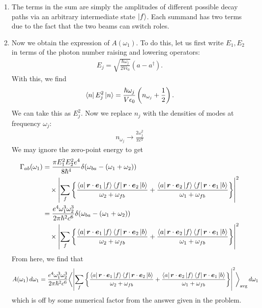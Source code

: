 \documentclass{article}
\theoremstyle{definition}
\newcommand{\f}[2]{\frac{#1}{#2}}
\newcommand{\lp}{\left(}
\newcommand{\rp}{\right)}
\newcommand{\lc}{\left\{}
\newcommand{\rc}{\right\}}
\begin{document}
\begin{enumerate}
\begin{enumerate}[label=(\roman*)]
		
		
		\item The terms in the sum are simply the amplitudes of different possible decay paths via an arbitrary intermediate state $\ket{f}$. Each summand has two terms due to the fact that the two beams can switch roles.
		
		\item Now we obtain the expression of $A(\omega_1)$. To do this, let us first write $E_1,E_2$ in terms of the photon number raising and lowering operators:
		\begin{align*}
		E_j = \sqrt{\f{\hbar \omega_j}{2 V \epsilon_0}}(a - a^\dagger).
		\end{align*}
		With this, we find 
		\begin{align*}
		\bra{n} E_j^2 \ket{n} = \f{\hbar \omega_j}{V\epsilon_0} \lp n_{\omega_j} + \f{1}{2} \rp.
		\end{align*}
		We can take this as $E_j^2$. Now we replace $n_j$ with the densities of modes at frequency $\omega_j$:
		\begin{align*}
		n_{\omega_j} \to \f{2\omega_j^2}{\pi c^3}
		\end{align*}
		We may ignore the zero-point energy to get
		\begin{align*}
		\Gamma_{ab}(\omega_1) &= \f{\pi E_1^2 E_2^2 e^4}{8\hbar^4}\delta(\omega_{ba} - (\omega_1 + \omega_2)) \\
		&\quad \times \abs{ \sum_f 
			\lc 
			\f{\bra{a} \bm{r}\cdot \bm{e}_1\ket{f}\bra{f} \bm{r}\cdot {\bm{e}}_2 \ket{b}}{\omega_2 + \omega_{fb}} + 
			\f{\bra{a} \bm{r}\cdot \bm{e}_2\ket{f}\bra{f} \bm{r}\cdot {\bm{e}}_1 \ket{b}}{\omega_{1} + \omega_{fb}}
			\rc }^2\\
		&= \f{e^4\omega_1^3 \omega_2^3}{2\pi \hbar^2 c^6}\delta(\omega_{ba} - (\omega_1 + \omega_2)) \\
		&\quad \times \abs{ \sum_f 
			\lc 
			\f{\bra{a} \bm{r}\cdot \bm{e}_1\ket{f}\bra{f} \bm{r}\cdot {\bm{e}}_2 \ket{b}}{\omega_2 + \omega_{fb}} + 
			\f{\bra{a} \bm{r}\cdot \bm{e}_2\ket{f}\bra{f} \bm{r}\cdot {\bm{e}}_1 \ket{b}}{\omega_{1} + \omega_{fb}}
			\rc }^2
		\end{align*}
		From here, we find that
		\begin{align*}
		A(\omega_1)\,d\omega_1 = \f{e^4\omega_1^3 \omega_2^3}{2\pi \hbar^2 c^6} \bigg\langle \abs{\sum_f \lc \f{\bra{a} \bm{r}\cdot \bm{e}_1\ket{f}\bra{f} \bm{r}\cdot {\bm{e}}_2 \ket{b}}{\omega_2 + \omega_{fb}} + 
			\f{\bra{a} \bm{r}\cdot \bm{e}_2\ket{f}\bra{f} \bm{r}\cdot {\bm{e}}_1 \ket{b}}{\omega_{1} + \omega_{fb}} \rc  }^2 \bigg\rangle_\text{avg}\,d\omega_1
		\end{align*}
		which is off by some numerical factor from the answer given in the problem. 
		

\end{enumerate}
\end{enumerate}
\end{document}

